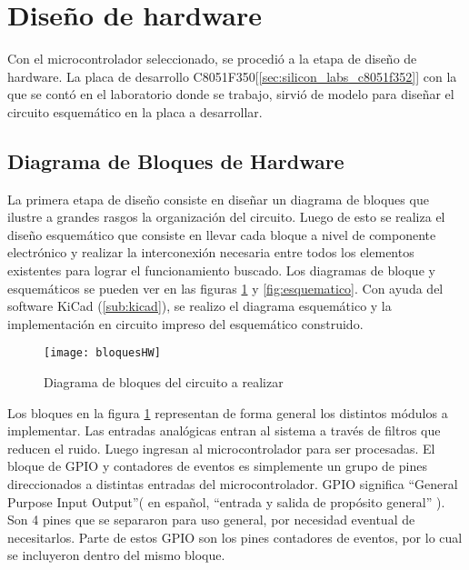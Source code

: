 \section{Diseño de hardware} %
\label{sec:diseno_de_hardware}




Con el microcontrolador seleccionado, se procedió a la etapa de diseño de hardware. La placa de desarrollo C8051F350[\ref{sec:silicon_labs_c8051f352}] con la que se contó en el laboratorio donde se trabajo, sirvió de modelo para diseñar el circuito esquemático en la placa a desarrollar.

\subsection{Diagrama de Bloques de Hardware} %
\label{sub:diagrama_de_bloques_de_hardware}

La primera etapa de diseño consiste en diseñar un diagrama de bloques que ilustre a grandes rasgos la organización del circuito. Luego de esto se realiza el diseño esquemático que consiste en llevar cada bloque a nivel de componente electrónico y realizar la interconexión necesaria entre todos los elementos existentes para lograr el funcionamiento buscado. Los diagramas de bloque y esquemáticos se pueden ver en las figuras \ref{fig:bloquesHW} y \ref{fig:esquematico}. Con ayuda del software KiCad (\ref{sub:kicad}), se realizo el diagrama esquemático y la implementación en circuito impreso del esquemático construido.

\begin{figure}[h]
  \centering
  \texttt{[image: bloquesHW]}
  \caption{\small Diagrama de bloques del circuito a realizar}\label{fig:bloquesHW}
\end{figure}

Los bloques en la figura \ref{fig:bloquesHW} representan de forma general los distintos módulos a implementar. Las entradas analógicas entran al sistema a través de filtros que reducen el ruido. Luego ingresan al microcontrolador para ser procesadas. El bloque de GPIO y contadores de eventos es simplemente un grupo de pines direccionados a distintas entradas del microcontrolador. GPIO significa ``General Purpose Input Output''( en español, ``entrada y salida de propósito general'' ). Son 4 pines que se separaron para uso general, por necesidad eventual de necesitarlos. Parte de estos GPIO son los pines contadores de eventos, por lo cual se incluyeron dentro del mismo bloque.

